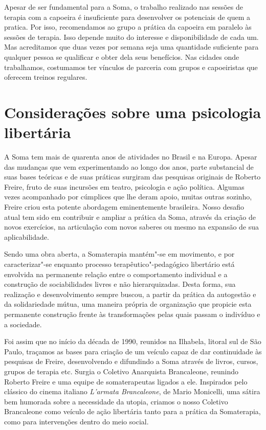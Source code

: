 Apesar de ser fundamental para a Soma, o trabalho realizado nas sessões
de terapia com a capoeira é insuficiente para desenvolver os potenciais
de quem a pratica. Por isso, recomendamos ao grupo a prática da capoeira
em paralelo às sessões de terapia. Isso depende muito do
interesse e disponibilidade de cada um. Mas acreditamos que duas vezes
por semana seja uma quantidade suficiente para qualquer pessoa se
qualificar e obter dela seus benefícios. Nas cidades onde
trabalhamos, costumamos ter vínculos de parceria com grupos e
capoeiristas que oferecem treinos regulares.

\chapter{Considerações sobre uma psicologia libertária}

A Soma tem mais de quarenta anos de atividades no Brasil e na Europa.
Apesar das mudanças que vem experimentando ao longo dos anos, parte
substancial de suas bases teóricas e de suas práticas surgiram das
pesquisas originais de Roberto Freire, fruto de suas incursões em
teatro, psicologia e ação política. Algumas vezes acompanhado por
cúmplices que lhe deram apoio, muitas outras sozinho, Freire criou esta
potente abordagem eminentemente brasileira. Nosso desafio atual tem sido
em contribuir e ampliar a prática da Soma, através da criação de novos
exercícios, na articulação com novos saberes ou mesmo na expansão de sua
aplicabilidade.

Sendo uma obra aberta, a Somaterapia mantém"-se em movimento, e por
caracterizar"-se enquanto processo terapêutico"-pedagógico libertário está
envolvida na permanente relação entre o comportamento individual e a
construção de sociabilidades livres e não hierarquizadas. Desta forma,
sua realização e desenvolvimento sempre buscou, a partir da prática da
autogestão e da solidariedade mútua, uma maneira própria de organização
que propicie esta permanente construção frente às transformações pelas quais
passam o indivíduo e a sociedade.

Foi assim que no início da década de 1990, reunidos na Ilhabela, litoral
sul de São Paulo, traçamos as bases para criação de um veículo capaz de
dar continuidade às pesquisas de Freire, desenvolvendo e difundindo a
Soma através de livros, cursos, grupos de terapia etc. Surgia o Coletivo
Anarquista Brancaleone, reunindo Roberto Freire e uma equipe de
somaterapeutas ligados a ele. Inspirados pelo clássico do cinema
italiano \emph{L'armata Brancaleone}, de Mario Monicelli, uma sátira
bem humorada sobre a necessidade da utopia, criamos o nosso Coletivo
Brancaleone como veículo de ação libertária tanto para a prática da
Somaterapia, como para intervenções dentro do meio social.

